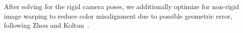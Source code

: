 After solving for the rigid camera poses, we additionally optimize for non-rigid image warping to reduce color misalignment due to possible geometric error, following Zhou and Koltun~\cite{zhou2014color}.

